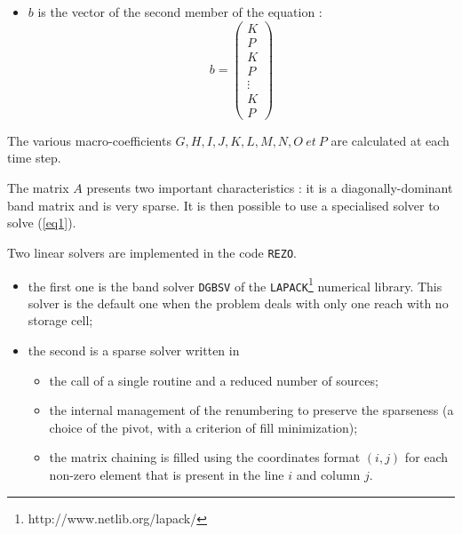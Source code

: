 \begin{itemize}
\begin{equation}
   \end{equation}
 \item $b$ is the vector of the second member of the equation :
   \begin{equation}
      \label{eq2}
      b = \left(
            \begin{array}{c}
               K\\
               P\\
               K\\
               P\\
               \vdots\\
               K\\
               P
            \end{array}
          \right)
   \end{equation}
\end{itemize}

\vspace{0.5cm}

The various macro-coefficients $G, H, I, J, K, L, M, N, O\ et\ P$ are calculated at each time step.

\vspace{0.5cm}

The matrix $A$ presents two important characteristics : it is a diagonally-dominant band matrix and is very sparse. It is then possible to use a specialised solver to solve (\ref{eq1}).

\vspace{0.5cm}

Two linear solvers are implemented in the code \texttt{REZO}.

\begin{itemize}
  \item the first one is the band solver \texttt{DGBSV} of the \texttt{LAPACK}\footnote{http://www.netlib.org/lapack/} numerical library. This solver is the default one when the problem deals with only one reach with no storage cell;
  \item the second is a sparse solver written in %
\begin{itemize}
 \item the call of a single routine and a reduced number of sources;
 \item the internal management of the renumbering to preserve the sparseness (a choice of the pivot, with a criterion of fill minimization);
 \item the matrix chaining is filled using the coordinates format $(i,j)$ for each non-zero element that is present in the line $i$ and column $j$.
\end{itemize} 

\end{itemize}

